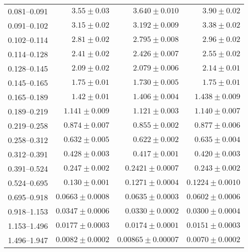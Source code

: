 \begin{table}
\begin{center}
\begin{tabular}{@{}l r r r@{}}
            0.081--0.091  &  $3.55     \pm  0.03$     &  $3.640    \pm  0.010$    &  $3.90     \pm  0.02$     \\
            0.091--0.102  &  $3.15     \pm  0.02$     &  $3.192    \pm  0.009$    &  $3.38     \pm  0.02$     \\
            0.102--0.114  &  $2.81     \pm  0.02$     &  $2.795    \pm  0.008$    &  $2.96     \pm  0.02$     \\
            0.114--0.128  &  $2.41     \pm  0.02$     &  $2.426    \pm  0.007$    &  $2.55     \pm  0.02$     \\
            0.128--0.145  &  $2.09     \pm  0.02$     &  $2.079    \pm  0.006$    &  $2.14     \pm  0.01$     \\
            0.145--0.165  &  $1.75     \pm  0.01$     &  $1.730    \pm  0.005$    &  $1.75     \pm  0.01$     \\
            0.165--0.189  &  $1.42     \pm  0.01$     &  $1.406    \pm  0.004$    &  $1.438    \pm  0.009$    \\
            0.189--0.219  &  $1.141    \pm  0.009$    &  $1.121    \pm  0.003$    &  $1.140    \pm  0.007$    \\
            0.219--0.258  &  $0.874    \pm  0.007$    &  $0.855    \pm  0.002$    &  $0.877    \pm  0.006$    \\
            0.258--0.312  &  $0.632    \pm  0.005$    &  $0.622    \pm  0.002$    &  $0.635    \pm  0.004$    \\
            0.312--0.391  &  $0.428    \pm  0.003$    &  $0.417    \pm  0.001$    &  $0.420    \pm  0.003$    \\
            0.391--0.524  &  $0.247    \pm  0.002$    &  $0.2421   \pm  0.0007$   &  $0.243    \pm  0.002$    \\
            0.524--0.695  &  $0.130    \pm  0.001$    &  $0.1271   \pm  0.0004$   &  $0.1224   \pm  0.0010$   \\
            0.695--0.918  &  $0.0663   \pm  0.0008$   &  $0.0635   \pm  0.0003$   &  $0.0602   \pm  0.0006$   \\
            0.918--1.153  &  $0.0347   \pm  0.0006$   &  $0.0330   \pm  0.0002$   &  $0.0300   \pm  0.0004$   \\
            1.153--1.496  &  $0.0177   \pm  0.0003$   &  $0.0174   \pm  0.0001$   &  $0.0151   \pm  0.0003$   \\
            1.496--1.947  &  $0.0082   \pm  0.0002$   &  $0.00865  \pm  0.00007$  &  $0.0070   \pm  0.0002$   \\

\end{tabular}
\end{center}
\end{table}
